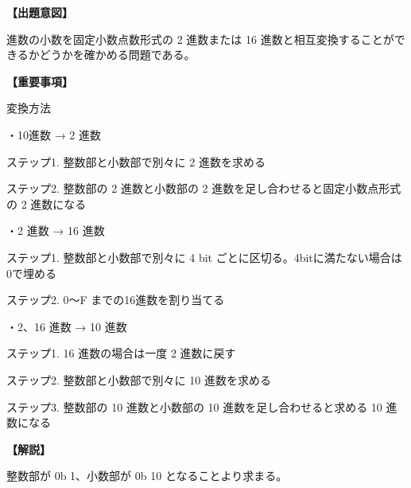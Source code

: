 \noindent \textbf{【出題意図】}

 進数の小数を固定小数点数形式の 2 進数または 16 進数と相互変換することができるかどうかを確かめる問題である。

\vspace{1em}
\noindent \textbf{【重要事項】}

\noindent 変換方法

\medskip
\noindent ・10進数 → 2 進数

\medskip
\noindent ステップ1. 整数部と小数部で別々に 2 進数を求める 

\noindent ステップ2. 整数部の 2 進数と小数部の 2 進数を足し合わせると固定小数点形式の 2 進数になる 

\medskip
\noindent ・2 進数 → 16 進数

\medskip
\noindent ステップ1. 整数部と小数部で別々に 4 bit ごとに区切る。4bitに満たない場合は0で埋める

\noindent ステップ2. 0〜F までの16進数を割り当てる


\medskip
\noindent ・2、16 進数 → 10 進数

\medskip
\noindent ステップ1. 16 進数の場合は一度 2 進数に戻す

\noindent ステップ2. 整数部と小数部で別々に 10 進数を求める 

\noindent ステップ3. 整数部の 10 進数と小数部の 10 進数を足し合わせると求める 10 進数になる 


\vspace{1em}
\noindent \textbf{【解説】}

\noindent 整数部が 0b 1、小数部が 0b 10 となることより求まる。
